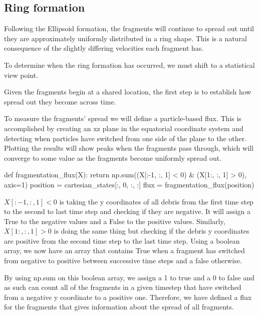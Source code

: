 \documentclass[a4paper, 12pt]{article}
\newenvironment{code}{\captionsetup{type=listing}}{}
\begin{document}
\subsection{Ring formation}

Following the Ellipsoid formation, the fragments will continue to spread out until they are approximately uniformly distributed in a ring shape. This is a natural consequence of the slightly differing velocities each fragment has. 

To determine when the ring formation has occurred, we must shift to a statistical view point.

Given the fragments begin at a shared location, the first step is to establish how spread out they become across time.

To measure the fragments' spread we will define a particle-based flux. This is accomplished by creating an xz plane in the equatorial coordinate system and detecting when particles have switched from one side of the plane to the other. Plotting the results will show peaks when the fragments pass through, which will converge to some value as the fragments become uniformly spread out.

\begin{code}
	\begin{tcbpythoncode}
		def fragmentation_flux(X):
			return np.sum((X[:-1, :, 1] < 0) & (X[1:, :, 1] > 0), axis=1)
		position = cartesian_states[:, 0, :, :]
		flux = fragmentation_flux(position)
	\end{tcbpythoncode}
\end{code}

$X[:-1, :, 1] < 0$ is taking the y coordinates of all debris from the first time step to the second to last time step and checking if they are negative. It will assign a True to the negative values and a False to the positive values. Similarly, $X[1:, :, 1] > 0$ is doing the same thing but checking if the debris y coordinates are positive from the second time step to the last time step. Using a boolean array, we now have an array that contains True when a fragment has switched from negative to positive between successive time steps and a false otherwise.

By using np.sum on this boolean array, we assign a 1 to true and a 0 to false and as such can count all of the fragments in a given timestep that have switched from a negative y coordinate to a positive one. Therefore, we have defined a flux for the fragments that gives information about the spread of all fragments.
\end{document}
